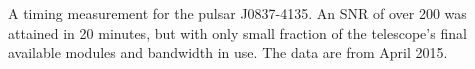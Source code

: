 A timing measurement for the pulsar J0837-4135. An SNR of over 200 was attained in 20 minutes, but with only small fraction of the telescope’s final available modules and bandwidth in use. The data are from April 2015.